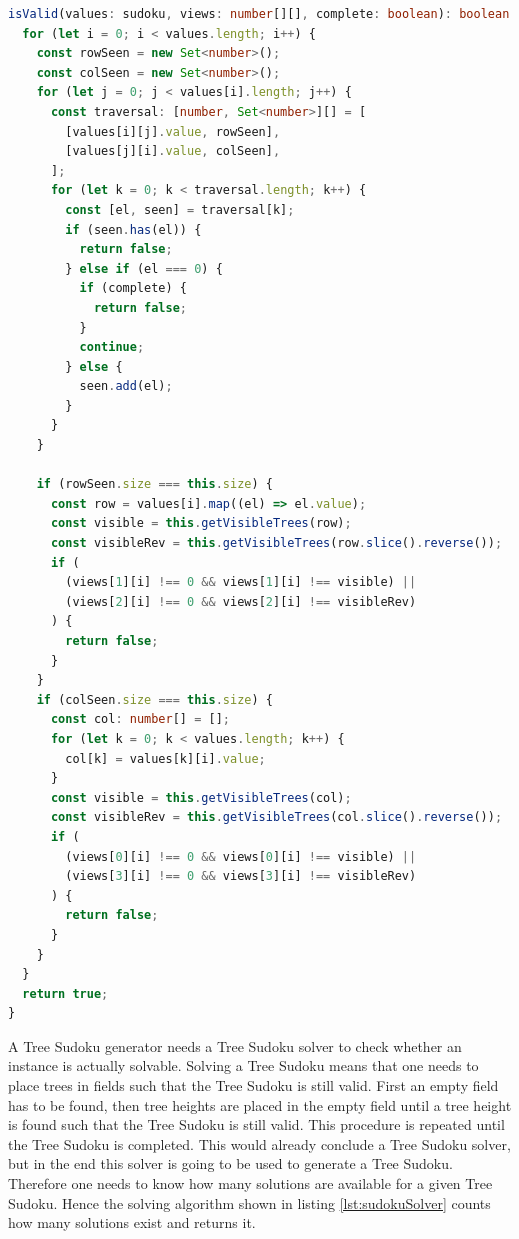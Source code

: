 \begin{lstlisting}[language=TypeScript,caption={Validation algorithm for a Tree Sudoku instance},label={lst:sudokuValidation}]
isValid(values: sudoku, views: number[][], complete: boolean): boolean {
  for (let i = 0; i < values.length; i++) {
    const rowSeen = new Set<number>();
    const colSeen = new Set<number>();
    for (let j = 0; j < values[i].length; j++) {
      const traversal: [number, Set<number>][] = [
        [values[i][j].value, rowSeen],
        [values[j][i].value, colSeen],
      ];
      for (let k = 0; k < traversal.length; k++) {
        const [el, seen] = traversal[k];
        if (seen.has(el)) {
          return false;
        } else if (el === 0) {
          if (complete) {
            return false;
          }
          continue;
        } else {
          seen.add(el);
        }
      }
    }

    if (rowSeen.size === this.size) {
      const row = values[i].map((el) => el.value);
      const visible = this.getVisibleTrees(row);
      const visibleRev = this.getVisibleTrees(row.slice().reverse());
      if (
        (views[1][i] !== 0 && views[1][i] !== visible) ||
        (views[2][i] !== 0 && views[2][i] !== visibleRev)
      ) {
        return false;
      }
    }
    if (colSeen.size === this.size) {
      const col: number[] = [];
      for (let k = 0; k < values.length; k++) {
        col[k] = values[k][i].value;
      }
      const visible = this.getVisibleTrees(col);
      const visibleRev = this.getVisibleTrees(col.slice().reverse());
      if (
        (views[0][i] !== 0 && views[0][i] !== visible) ||
        (views[3][i] !== 0 && views[3][i] !== visibleRev)
      ) {
        return false;
      }
    }
  }
  return true;
}
\end{lstlisting}

A Tree Sudoku generator needs a Tree Sudoku solver to check whether an instance is actually solvable. Solving a Tree Sudoku means that one needs to place trees in fields such that the Tree Sudoku is still valid. First an empty field has to be found, then tree heights are placed in the empty field until a tree height is found such that the Tree Sudoku is still valid. This procedure is repeated until the Tree Sudoku is completed. This would already conclude a Tree Sudoku solver, but in the end this solver is going to be used to generate a Tree Sudoku. Therefore one needs to know how many solutions are available for a given Tree Sudoku. Hence the solving algorithm shown in listing \ref{lst:sudokuSolver} counts how many solutions exist and returns it.

